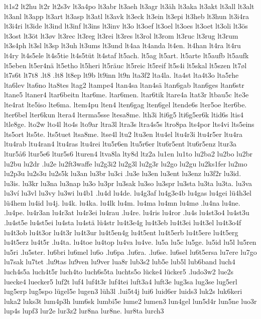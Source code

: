 {{lt1s2
lt2hu
lt2r
lt2s3v
lt3a4po
lt3abr
lt3aeh
lt3agr
lt3äh
lt3aka
lt3akt
lt3all
lt3alt
lt3anl
lt3app
lt3art
lt3asp
lt3atl
lt3avk
lt3eck
lt3ein
lt3epi
lt3heb
lt3hun
lt3i4ra
lt3i4ri
lt3ide
lt3ind
lt3inf
lt3ins
lt3inv
lt3o
lt3oef
lt3oel
lt3oes
lt3oet
lt3oli
lt3ös
lt3ost
lt3öt
lt3øv
lt3rec
lt3reg
lt3rei
lt3res
lt3rol
lt3rom
lt3ruc
lt3rug
lt3rum
lt3s4ph
lt3sl
lt3sp
lt3uh
lt3ums
lt3und
lt4aa
lt4anda
lt4en.
lt4han
lt4ra
lt4ru
lt4ry
lt4s5ele
lt4s5tie
lt4s5tüt
lt4staf
lt5ach.
lt5ag
lt5art.
lt5arte
lt5aufb
lt5aufk
lt5eben
lt5er4nä
lt5etho
lt5heri
lt5räuc
lt5reic
lt5reif
lt5s4i
lt5skal
lt5szen
lt7øl
lt7s6t
lt7t8
.lt8
.łt8
lt8ep
lt9b
lt9inn
lt9n
lta3f2
lta4la.
lta4st
lta4t3o
lta5rhe
lta6lev
lta6no
lta8tes
ltag2
ltampe4
ltan4sa
ltan4sä
ltan6gab
ltan6ges
ltan6str
ltane5
ltaner4
ltar6beitn
ltar6me.
ltar6men.
ltar6tik
ltare4a
ltat3r
ltbau5c
lte3e
lte4rat
lte5iso
lte6ma.
ltem4pu
lten4
lten6gag
lten6gel
ltende6s
lter5oe
lter6be.
lter6bel
lter6kun
ltera4
lterma5sse
ltesa8me.
lth3i
lti6g5
lti6g5er6k
ltid6s
ltis4
ltle8ge.
lto2w
lto4l
lto4s
lto9ar
ltra3l
ltra3s
ltra4s5s
ltro8pa
lts4por
lts4vi
lts5eins
lts5ort
lts5te.
lts5tuet
ltsa8me.
ltse4l
ltu2
ltu3en
ltu4el
ltu4r3i
ltu4r5er
ltu4ra
ltu4rab
ltu4ran4
ltu4ras
ltu4rei
ltu5r6en
ltu5r6er
ltu6r5ent
ltu6r5enz
ltur3a
ltur5å6
ltur5e6
ltur5s6
lturen4
ltva8la
lty8d
ltz2a
lu1en
lu1to
lu2ba2
lu2bo
lu2br
lu2bu
lu2dr
.lu2e
lu2ft3waffe
lu2g3i2
lu2g3l
lu2g3r
lu2go
lu2gu
lu2ks1fer
lu2mo
lu2p3u
lu2s3u
lu2s5k
lu3an
lu3br
lu3ci
.lu3e
lu3en
lu3ent
lu3enz
lu3f2r
lu3id.
lu3is.
lu3kr
lu3na
lu3nap
lu3o
lu3pr
lu3sak
lu3so
lu3spr
lu3sta
lu3ta
lu3ta.
lu3va
lu3ví
lu3vl
lu3vy
lu3wi
lu4b1
.lu4d
lu4de.
lu4g3af
lu4g3e4b
lu4gas
lu4gei
lü4h3el
lü4hem
lu4id
lu4j.
lu4k.
lu4ka.
lu4lk
lu4m.
lu4ma
lu4mn
lu4mø
.lu4na
lu4ne.
.lu4pe.
lu4r3an
lu4r3at
lu4r3ei
lu4rau
.lu4re.
lu4ris
lu4ror
.lu4s
lu4st3o4
lu4st3u
.lu4st5e
lu4st5ei
lu4sta
lu4stä
lü4str
lu4t3e4g
lu4t3eb
lu4t3ei
lu4t3el
lu4t3o4f
lu4t3ob
lu4t3or
lu4t3r
lu4t3ur
lu4t5en4g
lu4t5ent
lu4t5erb
lu4t5ere
lu4t5erg
lu4t5erz
lu4t5r
.lu4ta.
lu4toe
lu4top
lu4va
lu4ve.
lu5a
lu5c
lu5ge.
lu5id
lu5l
lu5ren
lu5ri
.lu5ster.
lu6bri
lu6mel
lu6o
.lu6pa
.lu6ra.
.lu6se.
lu6sel
lu6t5ersa
lu7ere
lu7go
lu7sak
lu7tet
.lu9tas
lu9ven
lu9ver
lua8r
lub3s2
lub5e
lub5l
lub6band
luch4
luch4s5a
luch4t5r
luch4to
luch6s5ta
luchts5o
lücke4
lücker5
.ludo3w2
lue2s
luecke4
luecker5
luf2t
luf4
luf4t3r
luf4tei
luft3a4
luft3e
lug3sa
lug3se
lug5erl
lug5erp
lug5spo
lügel5e
lugen3
lüh3l
.lui5t4j
lui6
luid6er
luids3
luk2s
luk6keri
luka2
luks3t
lum4p3h
lum6sk
lumbi5e
lume2
lumen3
lun4gel
lun5d4r
lun5ne
luo3r
lup4s
lupf3
lur2e
lur3z2
lur8na
lur8ne.
lur8ta
lurch3
}}
